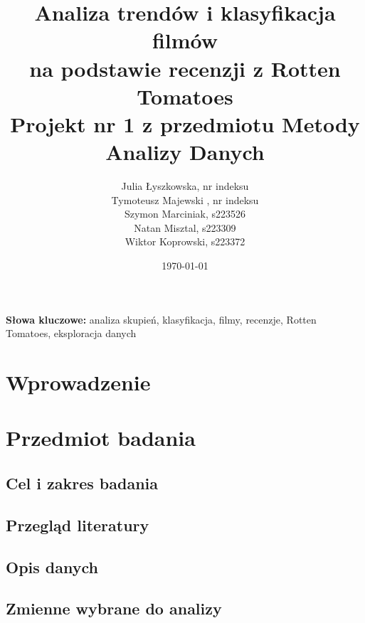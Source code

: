 \documentclass[a4paper,12pt]{article}
\title{Analiza trendów i klasyfikacja filmów\\na podstawie recenzji z Rotten Tomatoes\\\large Projekt nr 1 z przedmiotu Metody Analizy Danych}
\author{Julia Łyszkowska, nr indeksu\\Tymoteusz Majewski , nr indeksu\\Szymon Marciniak, s223526\\Natan Misztal, s223309\\Wiktor Koprowski, s223372}
\date{\today}
\begin{document}
\maketitle

\begin{abstract}
\end{abstract}

\noindent \textbf{Słowa kluczowe:} analiza skupień, klasyfikacja, filmy, recenzje, Rotten Tomatoes, eksploracja danych

\section{Wprowadzenie}

\section{Przedmiot badania}

\subsection{Cel i zakres badania}

\subsection{Przegląd literatury}

\subsection{Opis danych}

\subsection{Zmienne wybrane do analizy}
\end{document}
